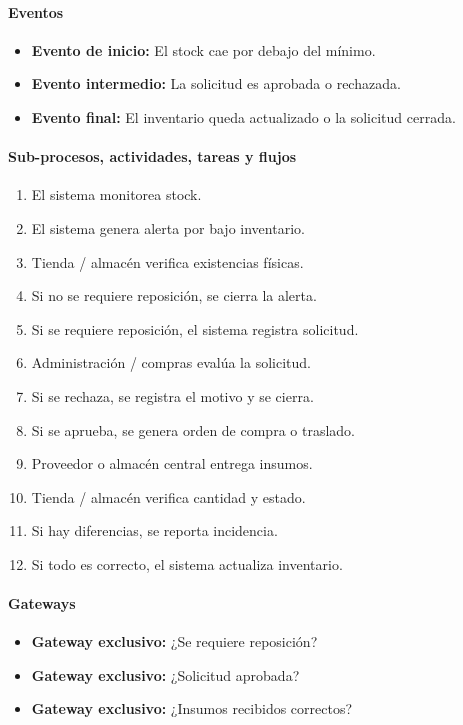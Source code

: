 \documentclass[a4paper,12pt]{article}
\begin{document}
\paragraph{Eventos}

\begin{itemize}
    \item \textbf{Evento de inicio:} El stock cae por debajo del mínimo.
    \item \textbf{Evento intermedio:} La solicitud es aprobada o rechazada.
    \item \textbf{Evento final:} El inventario queda actualizado o la solicitud cerrada.
\end{itemize}

\paragraph{Sub-procesos, actividades, tareas y flujos}

\begin{enumerate}
    \item El sistema monitorea stock.
    \item El sistema genera alerta por bajo inventario.
    \item Tienda / almacén verifica existencias físicas.
    \item Si no se requiere reposición, se cierra la alerta.
    \item Si se requiere reposición, el sistema registra solicitud.
    \item Administración / compras evalúa la solicitud.
    \item Si se rechaza, se registra el motivo y se cierra.
    \item Si se aprueba, se genera orden de compra o traslado.
    \item Proveedor o almacén central entrega insumos.
    \item Tienda / almacén verifica cantidad y estado.
    \item Si hay diferencias, se reporta incidencia.
    \item Si todo es correcto, el sistema actualiza inventario.
\end{enumerate}

\paragraph{Gateways}

\begin{itemize}
    \item \textbf{Gateway exclusivo:} ¿Se requiere reposición?
    \item \textbf{Gateway exclusivo:} ¿Solicitud aprobada?
    \item \textbf{Gateway exclusivo:} ¿Insumos recibidos correctos?
\end{itemize}
\end{document}
